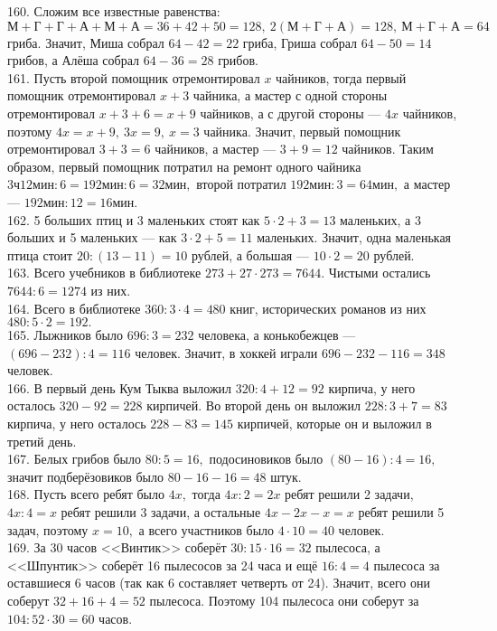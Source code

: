 160. Сложим все известные равенства: $\text{М}+\text{Г}+\text{Г}+\text{А}+\text{М}+\text{А}=36+42+50=128,\ 2(\text{М}+\text{Г}+\text{А})=128,\ \text{М}+\text{Г}+\text{А}=64$ гриба. Значит, Миша собрал $64-42=22$ гриба, Гриша собрал $64-50=14$ грибов, а Алёша собрал $64-36=28$ грибов.\\
161. Пусть второй помощник отремонтировал $x$ чайников, тогда первый помощник отремонтировал $x+3$ чайника, а мастер с одной стороны отремонтировал $x+3+6=x+9$ чайников, а с другой стороны --- $4x$ чайников, поэтому $4x=x+9,\ 3x=9,\ x=3$ чайника. Значит, первый помощник отремонтировал $3+3=6$ чайников, а мастер --- $3+9=12$ чайников. Таким образом, первый помощник потратил на ремонт одного чайника $3\text{ч}12\text{мин}:6=192\text{мин}:6=32\text{мин},$ второй потратил $192\text{мин}:3=64\text{мин},$ а мастер --- $192\text{мин}:12=16\text{мин}.$\\
162. 5 больших птиц и 3 маленьких стоят как $5\cdot2+3=13$ маленьких, а 3 больших и 5 маленьких --- как $3\cdot2+5=11$ маленьких. Значит, одна маленькая птица стоит $20:(13-11)=10$ рублей, а большая --- $10\cdot2=20$ рублей.\\
163. Всего учебников в библиотеке $273+27\cdot273=7644.$ Чистыми остались $7644:6=1274$ из них.\\
164. Всего в библиотеке $360:3\cdot4=480$ книг, исторических романов из них $480:5\cdot2=192.$\\
165. Лыжников было $696:3=232$ человека, а конькобежцев --- $(696-232):4=116$ человек. Значит, в хоккей играли $696-232-116=348$ человек.\\
166. В первый день Кум Тыква выложил $320:4+12=92$ кирпича, у него осталось $320-92=228$ кирпичей. Во второй день он выложил $228:3+7=83$ кирпича, у него осталось $228-83=145$ кирпичей, которые он и выложил в третий день.\\
167. Белых грибов было $80:5=16,$ подосиновиков было $(80-16):4=16,$ значит подберёзовиков было $80-16-16=48$ штук.\\
168. Пусть всего ребят было $4x,$ тогда $4x:2=2x$ ребят решили 2 задачи, $4x:4=x$ ребят решили 3 задачи, а остальные $4x-2x-x=x$ ребят решили 5 задач, поэтому $x=10,$ а всего участников было $4\cdot10=40$ человек.\\
169. За 30 часов <<Винтик>> соберёт $30:15\cdot16=32$ пылесоса, а <<Шпунтик>> соберёт 16 пылесосов за 24 часа и ещё $16:4=4$ пылесоса за оставшиеся 6 часов (так как 6 составляет четверть от 24). Значит, всего они соберут $32+16+4=52$ пылесоса. Поэтому 104 пылесоса они соберут за $104:52\cdot30=60$ часов.\\
